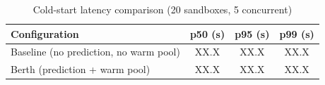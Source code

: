 \begin{table}[t]
\caption{Cold-start latency comparison (20 sandboxes, 5 concurrent)}
\label{tab:coldstart}
\centering
\begin{tabular}{lccc}
\toprule
\textbf{Configuration} & \textbf{p50 (s)} & \textbf{p95 (s)} & \textbf{p99 (s)} \\
\midrule
Baseline (no prediction, no warm pool) & XX.X & XX.X & XX.X \\
Berth (prediction + warm pool)         & XX.X  & XX.X & XX.X \\
\bottomrule
\end{tabular}
\end{table}
